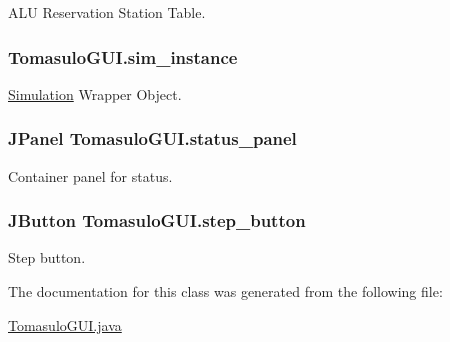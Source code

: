 \-A\-L\-U \-Reservation \-Station \-Table. 

\hypertarget{classTomasuloGUI_a9276faa3fed5236e393b96d517e2e6fc}{
\subsubsection[{sim\-\_\-instance}]{ {\bf \-Tomasulo\-G\-U\-I.\-sim\-\_\-instance}}}\label{classTomasuloGUI_a9276faa3fed5236e393b96d517e2e6fc}


\hyperlink{classSimulation}{\-Simulation} \-Wrapper \-Object. 

\hypertarget{classTomasuloGUI_a34dc546fcc88949fbdaa5b588b5e18ea}{
\subsubsection[{status\-\_\-panel}]{\setlength{\rightskip}{0pt plus 5cm}\-J\-Panel {\bf \-Tomasulo\-G\-U\-I.\-status\-\_\-panel}}}\label{classTomasuloGUI_a34dc546fcc88949fbdaa5b588b5e18ea}


\-Container panel for status. 

\hypertarget{classTomasuloGUI_ac489de22d16f3c43bae896eb5c8980a3}{
\subsubsection[{step\-\_\-button}]{\setlength{\rightskip}{0pt plus 5cm}\-J\-Button {\bf \-Tomasulo\-G\-U\-I.\-step\-\_\-button}}}\label{classTomasuloGUI_ac489de22d16f3c43bae896eb5c8980a3}


\-Step button. 



\-The documentation for this class was generated from the following file\-:\begin{DoxyCompactItemize}
\item 
\hyperlink{TomasuloGUI_8java}{\-Tomasulo\-G\-U\-I.\-java}\end{DoxyCompactItemize}
